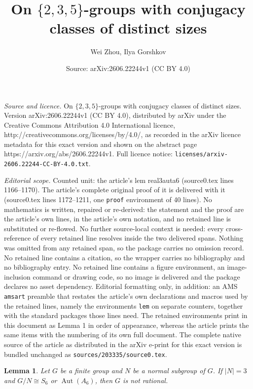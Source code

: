 \documentclass[10pt,a4paper]{amsart}
\title{On $\{2,3,5\}$-groups with conjugacy classes of distinct sizes}
\author{Wei Zhou, Ilya Gorshkov}
\date{Source: arXiv:2606.22244v1 (CC BY 4.0)}
\newtheorem{lem}{Lemma}
\providecommand{\Aut}{{\operatorname{Aut}}}
\begin{document}
\maketitle

\noindent\emph{Source and licence.} On $\{2,3,5\}$-groups with conjugacy classes of distinct sizes. Version arXiv:2606.22244v1 (CC BY 4.0), distributed by arXiv under the Creative Commons Attribution 4.0 International licence, http://creativecommons.org/licenses/by/4.0/, as recorded in the arXiv licence metadata for this exact version and shown on the abstract page https://arxiv.org/abs/2606.22244v1. Full licence notice: \texttt{licenses/arxiv-2606.22244-CC-BY-4.0.txt}.\par\smallskip

\noindent\textit{Editorial scope.} Counted unit: the article's lem real3auta6 (source0.tex lines 1166--1170). The article's complete original proof of it is delivered with it (source0.tex lines 1172--1211, one \texttt{proof} environment of 40 lines). No mathematics is written, repaired or re-derived: the statement and the proof are the article's own lines, in the article's own notation, and no retained line is substituted or re-flowed.  No further source-local context is needed: every cross-reference of every retained line resolves inside the two delivered spans.  Nothing was omitted from any retained span, so the package carries no omission record.  No retained line contains a citation, so the wrapper carries no bibliography and no bibliography entry.  No retained line contains a figure environment, an image-inclusion command or drawing code, so no image is delivered and the package declares no asset dependency.  Editorial formatting only, in addition: an AMS \texttt{amsart} preamble that restates the article's own declarations and macros used by the retained lines, namely the environments \texttt{lem} on separate counters, together with the standard packages those lines need.  The retained environments print in this document as Lemma 1 in order of appearance, whereas the article prints the same items with the numbering of its own full document.  The complete native source of the article as distributed in the arXiv e-print for this exact version is bundled unchanged as \texttt{sources/203335/source0.tex}.
\begin{lem}
\label{real3auta6}
    Let $G$ be a finite group and $N$ be a normal subgroup of $G$.
    If $|N|=3$ and $G/N\cong S_6$ or $\Aut(A_6)$, then $G$ is not rational.
\end{lem}
\end{document}
